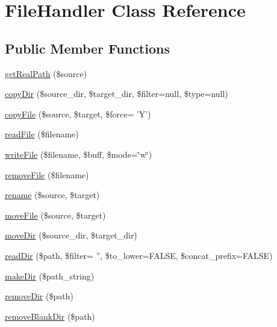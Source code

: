 \hypertarget{classFileHandler}{\section{File\-Handler Class Reference}
\label{classFileHandler}
}
\subsection*{Public Member Functions}
\begin{DoxyCompactItemize}
\item 
\hyperlink{classFileHandler_a6370b3eeddb705be04d9f60902a746e0}{get\-Real\-Path} (\$source)
\item 
\hyperlink{classFileHandler_a01289213af2a57f07018e7a84c8b9e87}{copy\-Dir} (\$source\-\_\-dir, \$target\-\_\-dir, \$filter=null, \$type=null)
\item 
\hyperlink{classFileHandler_a60d38b90a939a687ca5fde243936ff79}{copy\-File} (\$source, \$target, \$force= 'Y')
\item 
\hyperlink{classFileHandler_ac0bd2431461ad2bc04c093bfbb826bea}{read\-File} (\$filename)
\item 
\hyperlink{classFileHandler_ad90c10a81460f437bc68952427606155}{write\-File} (\$filename, \$buff, \$mode=\char`\"{}w\char`\"{})
\item 
\hyperlink{classFileHandler_aa5969f9fe0ce869fc736c4da384959e9}{remove\-File} (\$filename)
\item 
\hyperlink{classFileHandler_abfeaad5fe3c937fdbfed73f2138b3d48}{rename} (\$source, \$target)
\item 
\hyperlink{classFileHandler_aa558697af5a900f8594e1013f8d8b2c8}{move\-File} (\$source, \$target)
\item 
\hyperlink{classFileHandler_acb0c863aeb4f29a5ee89eb8f47d576ca}{move\-Dir} (\$source\-\_\-dir, \$target\-\_\-dir)
\item 
\hyperlink{classFileHandler_a02d0cada88becf977968d961df2f864b}{read\-Dir} (\$path, \$filter= '', \$to\-\_\-lower=F\-A\-L\-S\-E, \$concat\-\_\-prefix=F\-A\-L\-S\-E)
\item 
\hyperlink{classFileHandler_a9c2502d10c34a3996f1d6927624a7824}{make\-Dir} (\$path\-\_\-string)
\item 
\hyperlink{classFileHandler_a55015d030d3773d96281b0fa4bda986e}{remove\-Dir} (\$path)
\item 
\hyperlink{classFileHandler_a538bfd50008250786985c7da4ff768f1}{remove\-Blank\-Dir} (\$path)
\item 

\end{DoxyCompactItemize}
